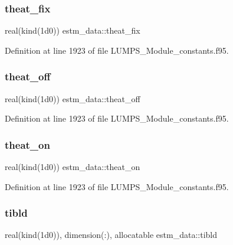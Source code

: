 \subsubsection{\texorpdfstring{theat\+\_\+fix}{theat\_fix}}
{\footnotesize\ttfamily real(kind(1d0)) estm\+\_\+data\+::theat\+\_\+fix}



Definition at line 1923 of file L\+U\+M\+P\+S\+\_\+\+Module\+\_\+constants.\+f95.

\mbox{\label{namespaceestm__data_a20d9fef092d33c94a656983052f17b8d}} 
\subsubsection{\texorpdfstring{theat\+\_\+off}{theat\_off}}
{\footnotesize\ttfamily real(kind(1d0)) estm\+\_\+data\+::theat\+\_\+off}



Definition at line 1923 of file L\+U\+M\+P\+S\+\_\+\+Module\+\_\+constants.\+f95.

\mbox{\label{namespaceestm__data_afbff94a2d61692610e6181c1a557b1b6}} 
\subsubsection{\texorpdfstring{theat\+\_\+on}{theat\_on}}
{\footnotesize\ttfamily real(kind(1d0)) estm\+\_\+data\+::theat\+\_\+on}



Definition at line 1923 of file L\+U\+M\+P\+S\+\_\+\+Module\+\_\+constants.\+f95.

\mbox{\label{namespaceestm__data_ac5581091bba0f750cbe63327619693a5}} 
\subsubsection{\texorpdfstring{tibld}{tibld}}
{\footnotesize\ttfamily real(kind(1d0)), dimension(\+:), allocatable estm\+\_\+data\+::tibld}



